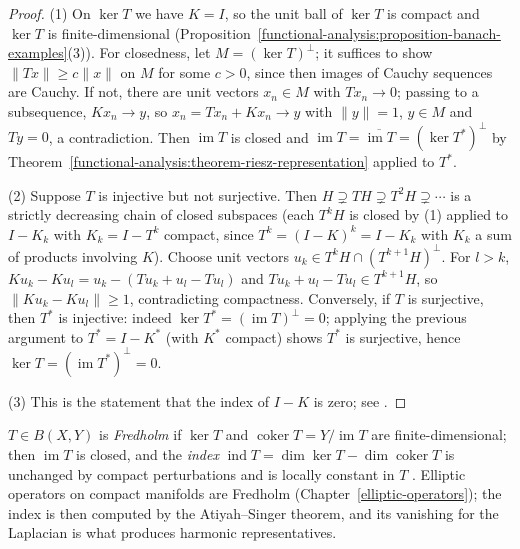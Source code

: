 \begin{proof}
(1) On $\ker T$ we have $K = I$, so the unit ball of $\ker T$ is compact and $\ker T$ is finite-dimensional (Proposition~\ref{functional-analysis:proposition-banach-examples}(3)). For closedness, let
$M = (\ker T)^\perp$; it suffices to show $\|Tx\| \geq c\|x\|$ on $M$ for some $c > 0$, since then images of Cauchy sequences are Cauchy. If not, there are unit vectors $x_n \in M$ with $Tx_n \to 0$; passing to a
subsequence, $Kx_n \to y$, so $x_n = Tx_n + Kx_n \to y$ with $\|y\| = 1$, $y \in M$ and $Ty = 0$, a contradiction. Then $\operatorname{im}T$ is closed and
$\operatorname{im}T = \overline{\operatorname{im}T} = (\ker T^*)^\perp$ by Theorem~\ref{functional-analysis:theorem-riesz-representation} applied to $T^*$.

(2) Suppose $T$ is injective but not surjective. Then $H \supsetneq TH \supsetneq T^2H \supsetneq \cdots$ is a strictly decreasing chain of closed subspaces (each $T^kH$ is closed by (1) applied to
$I - K_k$ with $K_k = I - T^k$ compact, since $T^k = (I - K)^k = I - K_k$ with $K_k$ a sum of products involving $K$). Choose unit vectors $u_k \in T^kH \cap (T^{k+1}H)^\perp$. For $l > k$,
$Ku_k - Ku_l = u_k - (Tu_k + u_l - Tu_l)$ and $Tu_k + u_l - Tu_l \in T^{k+1}H$, so $\|Ku_k - Ku_l\| \geq 1$, contradicting compactness. Conversely, if $T$ is surjective, then $T^*$ is injective: indeed
$\ker T^* = (\operatorname{im}T)^\perp = 0$; applying the previous argument to $T^* = I - K^*$ (with $K^*$ compact) shows $T^*$ is surjective, hence $\ker T = (\operatorname{im}T^*)^\perp = 0$.

(3) This is the statement that the index of $I - K$ is zero; see \cite[Theorem 6.6]{brezis-functional}.
\end{proof}

\begin{remark}\label{functional-analysis:remark-fredholm-operators}
$T \in B(X, Y)$ is \emph{Fredholm} if $\ker T$ and $\operatorname{coker}T = Y/\operatorname{im}T$ are finite-dimensional; then $\operatorname{im}T$ is closed, and the \emph{index}
$\operatorname{ind}T = \dim\ker T - \dim\operatorname{coker}T$ is unchanged by compact perturbations and is locally constant in $T$ \cite[Chapter 6]{brezis-functional}. Elliptic operators on compact
manifolds are Fredholm (Chapter~\ref{elliptic-operators}); the index is then computed by the Atiyah--Singer theorem, and its vanishing for the Laplacian is what produces harmonic representatives.
\end{remark}

